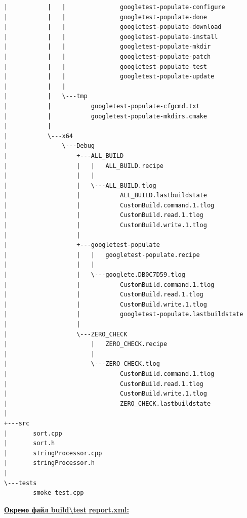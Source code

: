 \documentclass[a4paper,12pt]{article}
\begin{document}
\begin{verbatim}
|           |   |               googletest-populate-configure
|           |   |               googletest-populate-done
|           |   |               googletest-populate-download
|           |   |               googletest-populate-install
|           |   |               googletest-populate-mkdir
|           |   |               googletest-populate-patch
|           |   |               googletest-populate-test
|           |   |               googletest-populate-update
|           |   |               
|           |   \---tmp
|           |           googletest-populate-cfgcmd.txt
|           |           googletest-populate-mkdirs.cmake
|           |           
|           \---x64
|               \---Debug
|                   +---ALL_BUILD
|                   |   |   ALL_BUILD.recipe
|                   |   |   
|                   |   \---ALL_BUILD.tlog
|                   |           ALL_BUILD.lastbuildstate
|                   |           CustomBuild.command.1.tlog
|                   |           CustomBuild.read.1.tlog
|                   |           CustomBuild.write.1.tlog
|                   |           
|                   +---googletest-populate
|                   |   |   googletest-populate.recipe
|                   |   |   
|                   |   \---googlete.DB0C7D59.tlog
|                   |           CustomBuild.command.1.tlog
|                   |           CustomBuild.read.1.tlog
|                   |           CustomBuild.write.1.tlog
|                   |           googletest-populate.lastbuildstate
|                   |           
|                   \---ZERO_CHECK
|                       |   ZERO_CHECK.recipe
|                       |   
|                       \---ZERO_CHECK.tlog
|                               CustomBuild.command.1.tlog
|                               CustomBuild.read.1.tlog
|                               CustomBuild.write.1.tlog
|                               ZERO_CHECK.lastbuildstate
|                               
+---src
|       sort.cpp
|       sort.h
|       stringProcessor.cpp
|       stringProcessor.h
|       
\---tests
        smoke_test.cpp
    \end{verbatim}

    \textbf{\underline{Окремо файл build\textbackslash test$\_$report.xml:}}
\end{document}
